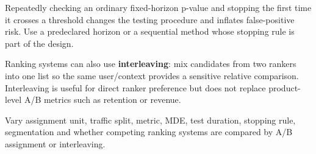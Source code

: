 Repeatedly checking an ordinary fixed-horizon p-value and stopping the first time it crosses a threshold changes the testing procedure and inflates false-positive risk.
Use a predeclared horizon or a sequential method whose stopping rule is part of the design.

Ranking systems can also use \textbf{interleaving}: mix candidates from two rankers into one list so the same user/context provides a sensitive relative comparison.
Interleaving is useful for direct ranker preference but does not replace product-level A/B metrics such as retention or revenue.

\begin{calloutdegreeofexperiment}
    Vary assignment unit, traffic split, metric, MDE, test duration, stopping rule, segmentation and whether competing ranking systems are compared by A/B assignment or interleaving.
\end{calloutdegreeofexperiment}
